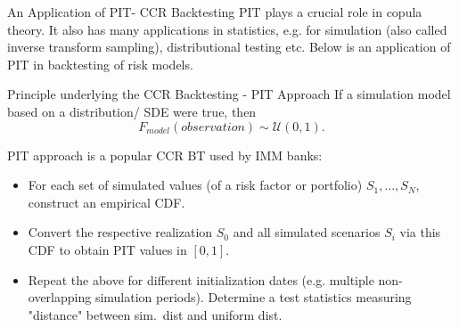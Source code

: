 \documentclass[envcountsect]{beamer}
\theoremstyle{definition}
\theoremstyle{plain}
\newcommand*{\udist}{\mathcal{U}(0,1)}
\begin{document}
\begin{frame}{An Application of PIT- CCR Backtesting}
PIT plays a crucial role in copula theory. It also has many applications in statistics, e.g. for simulation (also called inverse transform sampling), distributional testing etc. Below is an application of PIT in backtesting of risk models.
	\begin{block}{Principle underlying the CCR Backtesting - PIT Approach}
		If a simulation model based on a distribution/ SDE were true, then \[ F_{model}(observation) \sim \udist.\]
	\end{block}
PIT approach is a popular CCR BT used by IMM banks:
\begin{itemize}
	\item For each set of simulated values (of a risk factor or portfolio) $S_1,...,S_N$, construct an empirical CDF.
	\item Convert the respective realization $S_0$ and all simulated scenarios $S_i$ via this CDF to obtain PIT values in $[0,1]$.
	\item Repeat the above for different initialization dates (e.g. multiple non-overlapping simulation periods). Determine a test statistics measuring "distance" between sim.~dist and uniform dist.
\end{itemize}
\end{frame}
\end{document}
